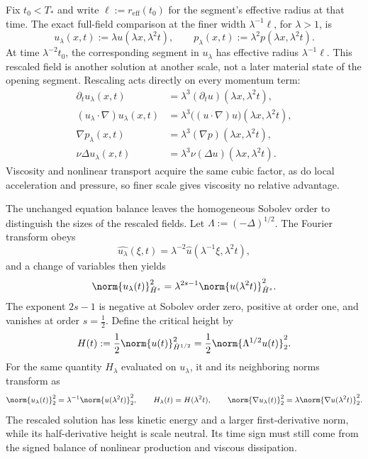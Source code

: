 
Fix $t_0<T_*$ and write $\ell:=r_{\mathrm{eff}}(t_0)$ for the segment's effective radius at that time.
The exact full-field comparison at the finer width $\lambda^{-1}\ell$, for $\lambda>1$, is
\[
  u_\lambda(x,t)
  :=
  \lambda u(\lambda x,\lambda^2t),
  \qquad
  p_\lambda(x,t)
  :=
  \lambda^2p(\lambda x,\lambda^2t).
\]
At time $\lambda^{-2}t_0$, the corresponding segment in $u_\lambda$ has effective radius $\lambda^{-1}\ell$.
This rescaled field is another solution at another scale, not a later material state of the opening segment.
Rescaling acts directly on every momentum term:
\[
\begin{aligned}
  \partial_tu_\lambda(x,t)
  &=
  \lambda^3(\partial_tu)(\lambda x,\lambda^2t),
  \\
  (u_\lambda\cdot\nabla)u_\lambda(x,t)
  &=
  \lambda^3\bigl((u\cdot\nabla)u\bigr)(\lambda x,\lambda^2t),
  \\
  \nabla p_\lambda(x,t)
  &=
  \lambda^3(\nabla p)(\lambda x,\lambda^2t),
  \\
  \nu\Delta u_\lambda(x,t)
  &=
  \lambda^3\nu(\Delta u)(\lambda x,\lambda^2t).
\end{aligned}
\]
Viscosity and nonlinear transport acquire the same cubic factor, as do local acceleration and pressure, so finer scale gives viscosity no relative advantage.


The unchanged equation balance leaves the homogeneous Sobolev order to distinguish the sizes of the rescaled fields.
Let $\Lambda:=(-\Delta)^{1/2}$.
The Fourier transform obeys
\[
  \widehat{u_\lambda}(\xi,t)
  =
  \lambda^{-2}\widehat u(\lambda^{-1}\xi,\lambda^2t),
\]
and a change of variables then yields
\[
  \norm{u_\lambda(t)}_{\dot H^s}^2
  =
  \lambda^{2s-1}
  \norm{u(\lambda^2t)}_{\dot H^s}^2.
\]
The exponent $2s-1$ is negative at Sobolev order zero, positive at order one, and vanishes at order $s=\tfrac12$.
Define the critical height by
\[
  H(t)
  :=
  \frac12\norm{u(t)}_{\dot H^{1/2}}^2
  =
  \frac12\norm{\Lambda^{1/2}u(t)}_2^2.
\]
For the same quantity $H_\lambda$ evaluated on $u_\lambda$, it and its neighboring norms transform as
\[
  \norm{u_\lambda(t)}_2^2
  =
  \lambda^{-1}\norm{u(\lambda^2t)}_2^2,
  \qquad
  H_\lambda(t)=H(\lambda^2t),
  \qquad
  \norm{\nabla u_\lambda(t)}_2^2
  =
  \lambda\norm{\nabla u(\lambda^2t)}_2^2.
\]
The rescaled solution has less kinetic energy and a larger first-derivative norm, while its half-derivative height is scale neutral.
Its time sign must still come from the signed balance of nonlinear production and viscous dissipation.

